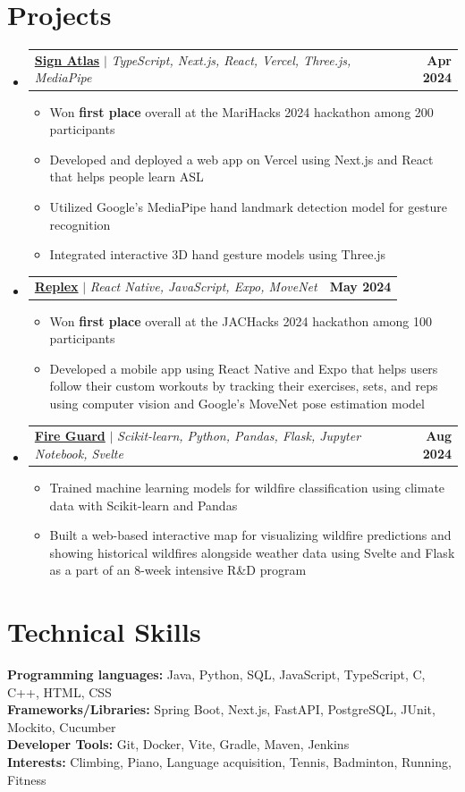 \documentclass[letterpaper,11pt]{article}
\makeatletter
\newcommand{\resumeItem}[1]{
  \item\small{
    {#1 \vspace{-2pt}}
  }
}
\newcommand{\resumeProjectHeading}[4]{
  \item
  \begin{tabular*}{\textwidth}{l@{\extracolsep{\fill}}r}
    \small{\href{#3}{\textbf{#1}\hspace{0.3em}{\faLink}} $|$ \emph{#2}} & \textbf{\small #4} \\
  \end{tabular*}\vspace{-7pt}
}
\newcommand{\resumeSubHeadingListStart}{\begin{itemize}[leftmargin=0in, label={}]}
\newcommand{\resumeSubHeadingListEnd}{\end{itemize}}
\newcommand{\resumeItemListStart}{\begin{itemize}}
\newcommand{\resumeItemListEnd}{\end{itemize}\vspace{-5pt}}
\makeatother
\begin{document}
\section{Projects}
    \resumeSubHeadingListStart
      \resumeProjectHeading
          {Sign Atlas}
          {TypeScript, Next.js, React, Vercel, Three.js, MediaPipe}
          {https://devpost.com/software/sign-atlas}
          {Apr 2024}
          \resumeItemListStart
            \resumeItem{Won \textbf{first place} overall at the MariHacks 2024 hackathon among 200 participants}
            \resumeItem{Developed and deployed a web app on Vercel using Next.js and React that helps people learn ASL}
            \resumeItem{Utilized Google’s MediaPipe hand landmark detection model for gesture recognition}
            \resumeItem{Integrated interactive 3D hand gesture models using Three.js}
          \resumeItemListEnd
      \resumeProjectHeading
          {Replex}
          {React Native, JavaScript, Expo, MoveNet}
          {https://devpost.com/software/replex}
          {May 2024}
          \resumeItemListStart
            \resumeItem{Won \textbf{first place} overall at the JACHacks 2024 hackathon among 100 participants}
            \resumeItem{Developed a mobile app using React Native and Expo that helps users follow their custom workouts by tracking their exercises, sets, and reps using computer vision and Google’s MoveNet pose estimation model}
          \resumeItemListEnd
      \resumeProjectHeading
          {Fire Guard}
          {Scikit-learn, Python, Pandas, Flask, Jupyter Notebook, Svelte}
          {https://github.com/tran-ethan/fire-guard}
          {Aug 2024}
          \resumeItemListStart
            \resumeItem{Trained machine learning models for wildfire classification using climate data with Scikit-learn and Pandas}
            \resumeItem{Built a web-based interactive map for visualizing wildfire predictions and showing historical wildfires alongside weather data using Svelte and Flask as a part of an 8-week intensive R\&D program}
          \resumeItemListEnd
    \resumeSubHeadingListEnd

%
\section{Technical Skills}
 \begin{itemize}[leftmargin=0in, label={}]
    \small{\item{
     \textbf{Programming languages:}{ Java, Python, SQL, JavaScript, TypeScript, C, C++, HTML, CSS} \\
     \textbf{Frameworks/Libraries:}{ Spring Boot, Next.js, FastAPI, PostgreSQL, JUnit, Mockito, Cucumber} \\
     \textbf{Developer Tools:}{ Git, Docker, Vite, Gradle, Maven, Jenkins} \\
     \textbf{Interests:}{ Climbing, Piano, Language acquisition, Tennis, Badminton, Running, Fitness } \\
    }}
 \end{itemize}

\end{document}
